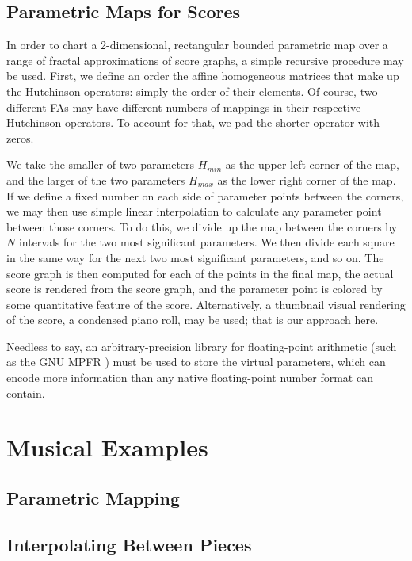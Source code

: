 \documentclass[english,11pt,letterpaper,onecolumn]{scrartcl}
\numberwithin{equation}{section}
\begin{document}
\subsection{Parametric Maps for Scores}

In order to chart a 2-dimensional, rectangular bounded parametric map over a
range of fractal approximations of score graphs, a simple recursive procedure
may be used. First, we define an order the affine homogeneous matrices that make
up the Hutchinson operators: simply the order of their elements. Of course, two
different FAs may have different numbers of mappings in their respective
Hutchinson operators. To account for that, we pad the shorter operator with
zeros.

We take the smaller of two parameters $H_{min}$ as the upper left corner of the
map, and the larger of the two parameters $H_{max}$ as the lower right corner of
the map. If we define a fixed number on each side of parameter points between
the corners, we may then use simple linear interpolation to calculate any
parameter point between those corners. To do this, we divide up the map between
the corners by $N$ intervals for the two most significant parameters. We then
divide each square in the same way for the next two most significant parameters,
and so on. The score graph is then computed for each of the points in the final
map, the actual score is rendered from the score graph, and the parameter point
is colored by some quantitative feature of the score. Alternatively, a thumbnail
visual rendering of the score, a condensed piano roll, may be used; that is our
approach here.

Needless to say, an arbitrary-precision library for floating-point arithmetic
(such as the GNU MPFR \cite{Fousse:2007:MMB:1236463.1236468}) must be used to
store the virtual parameters, which can encode more information than any native
floating-point number format can contain.

\section{Musical Examples}

\subsection{Parametric Mapping}

\subsection{Interpolating Between Pieces}
\end{document}
